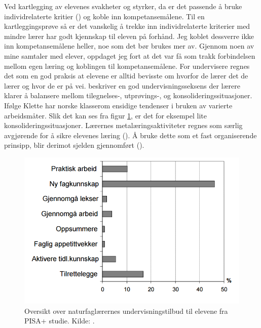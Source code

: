 \documentclass[main.tex]{subfiles}
\begin{document}
Ved kartlegging av elevenes svakheter og styrker, da er det passende å bruke
individrelaterte kritier () og koble inn kompetansemålene. Til en kartleggingsprøve så er det 
vanskelig å trekke inn individrelaterte kriterier med mindre lærer har godt kjennskap til eleven på forhånd. Jeg 
koblet dessverre ikke inn kompetansemålene heller, noe som det bør brukes mer av. Gjennom noen av mine samtaler 
med elever, oppdaget jeg fort at det var få som trakk forbindelsen mellom egen læring og koblingen til kompetansemålene. 
For undervisere regnes det som en god praksis at elevene er alltid bevisste om hvorfor de lærer det de lærer og hvor 
de er på vei.  beskriver en god undervisningsseksens der lærere klarer å balansere mellom 
tilegnelses-, utprøvings-, og konsolideringssituasjoner. Ifølge Klette har norske klasserom ensidige tendenser i bruken 
av varierte arbeidsmåter. Slik det kan ses fra figur \ref{fig:odeg10}, er det for eksempel lite 
konsolideringssituasjoner. Lærernes metalæringsaktiviteter regnes som særlig avgjørende for å sikre elevenes læring 
(). Å bruke dette som et fast organiserende prinsipp, blir derimot sjelden gjennomført 
().
\begin{figure}[h!]
\includegraphics[scale = 0.6]{../figures/undervisnings_aktivitet.png}
\caption{Oversikt over naturfaglærernes undervisningstilbud til elevene fra PISA+ studie. Kilde: 
\protect{}.}
\label{fig:odeg10}
\end{figure}
\newline
\end{document}
